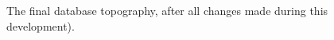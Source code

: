 \documentclass{article}
\begin{document}
\begin{figure}[h!]
    \centering
    \caption{The final database topography, after all changes made during this development).}
    \label{fig:finaldb}
\end{figure}
\end{document}
